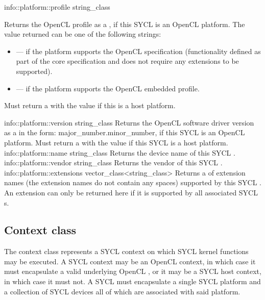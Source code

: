   \addInfoRow
    {info::platform::profile}
    {string_class}
    {
      Returns the OpenCL profile as a , if this SYCL  is an OpenCL platform. The value returned can be one of the following strings:
      \begin{itemize}
        \item {} --- if the platform supports the OpenCL specification (functionality defined as part of the core specification and does not require any extensions to be supported).
        \item {} --- if the platform supports the OpenCL embedded profile.
      \end{itemize}
    Must return a  with the value  if this is a host platform.
    }
    \addInfoRow
    {info::platform::version}
    {string_class}
    {
      Returns the OpenCL software driver version as a  in the form: major_number.minor_number, if this SYCL  is an OpenCL platform. Must return a  with the value  if this SYCL  is a host platform.
    }
  \addInfoRow
    {info::platform::name}
    {string_class}
    {
      Returns the device name of this SYCL .
    }
  \addInfoRow
    {info::platform::vendor}
    {string_class}
    {
      Returns the vendor of this SYCL .
    }
  \addInfoRow
    {info::platform::extensions}
    {vector_class<string_class>}
    {
      Returns a  of extension names (the extension names do not contain any spaces) supported by this SYCL . An extension can only be returned here if it is supported by all associated SYCL s.
    }
\completeTable


\subsection{Context class}
\label{sec:interface.context.class}

The \gls{context} class represents a SYCL \gls{context} on which SYCL kernel functions may be executed. A SYCL \gls{context} may be an OpenCL context, in which case it must encapsulate a valid underlying OpenCL , or it may be a SYCL host context, in which case it must not. A SYCL  must encapsulate a single SYCL \gls{platform} and a collection of SYCL \gls{device}s all of which are associated with said \gls{platform}.


